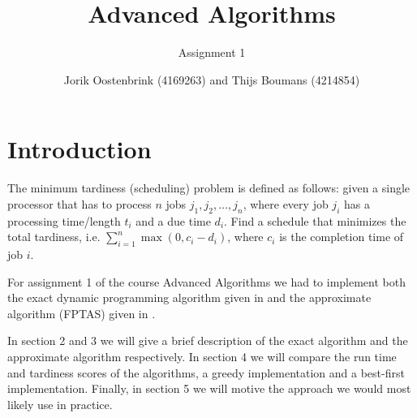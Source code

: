 \documentclass[a4paper,11pt]{article}
\title{Advanced Algorithms}
\subtitle{Assignment 1}
\author{Jorik Oostenbrink (4169263) and Thijs Boumans (4214854)}
\date{}
\begin{document}
	
\maketitle

\section{Introduction}
The minimum tardiness (scheduling) problem is defined as follows: given a single processor that has to process $n$ jobs $j_1,j_2,\dots,j_n$, where every job $j_i$ has a processing time/length $t_i$ and a due time $d_i$. Find a schedule that minimizes the total tardiness, i.e. $\sum_{i=1}^{n}{\max(0,c_i - d_i)}$, where $c_i$ is the completion time of job $i$.

For assignment 1 of the course Advanced Algorithms we had to implement both the exact dynamic programming algorithm given in \cite{exact} and the approximate algorithm (FPTAS) given in \cite{approx}.

In section 2 and 3 we will give a brief description of the exact algorithm and the approximate algorithm respectively. In section 4 we will compare the run time and tardiness scores of the algorithms, a greedy implementation and a best-first implementation. Finally, in section 5 we will motive the approach we would most likely use in practice.
	


\end{document}
